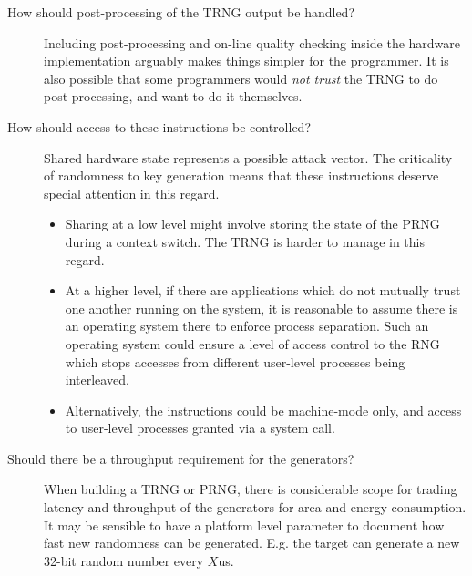 \begin{description}
\begin{description}
    \item[How should post-processing of the TRNG output be handled?]
    Including post-processing and on-line quality checking inside the
    hardware implementation arguably makes things simpler for the programmer.
    It is also possible that some programmers would {\em not trust} the TRNG
    to do post-processing, and want to do it themselves.

    \item[How should access to these instructions be controlled?]
    Shared hardware state represents a possible attack vector.  The
    criticality of randomness to key generation means that these instructions
    deserve special attention in this regard.

    \begin{itemize}

    \item Sharing at a low level might involve storing the state of the PRNG
    during a context switch. The TRNG is harder to manage in this regard.

    \item At a higher level, if there are applications which do not mutually
    trust one another running on the system, it is reasonable to assume there
    is an operating system there to enforce process separation.  Such an
    operating system could ensure a level of access control to the RNG which
    stops accesses from different user-level processes being interleaved.

    \item Alternatively, the instructions could be machine-mode only, and
    access to user-level processes granted via a system call.
    \end{itemize}

    \item[Should there be a throughput requirement for the generators?]
    When building a TRNG or PRNG, there is considerable scope for trading
    latency and throughput of the generators for area and energy consumption.
    It may be sensible to have a platform level parameter to document how
    fast new randomness can be generated. E.g. the target can generate a new
    32-bit random number every $X$us.

    \end{description}



\end{description}

